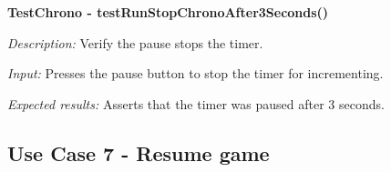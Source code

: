 \documentclass[12pt]{article}
\begin{document}
\textbf{TestChrono - testRunStopChronoAfter3Seconds()} 
    
\textit{Description:} \newline
Verify the pause stops the timer. \newline

\textit{Input:} \newline
Presses the pause button to stop the timer for incrementing. \newline 

\textit{Expected results:} \newline
Asserts that the timer was paused after 3 seconds. \newline
\\

\newpage


\subsection{Use Case 7 - Resume game}
\end{document}
